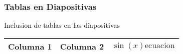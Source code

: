 \documentclass[11.5pt,letterpaper]{beamer}
\begin{document}
\begin{frame}
\frametitle{Tablas en Diapositivas}

\begin{center}

 \normalfont Inclusion de tablas en las diapositivas

\end{center}
\begin{center}
\begin{tabular}[c]{|c||c|c|} %

\hline %

\hline \hline %
Columna 1 & Columna 2 & $\sin(x) \text{ecuacion}$ \\ \hline %

\end{tabular}
\end{center}

\end{frame}

\end{document}
